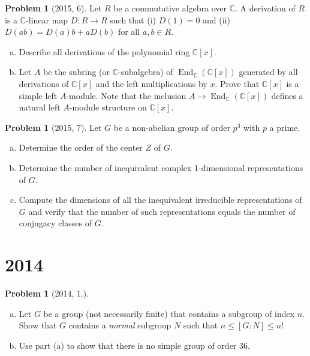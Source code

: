 \documentclass{article}
\newcommand{\<}{\langle} %
\renewcommand{\>}{\rangle} %
\DeclareMathOperator{\End}{End}
\theoremstyle{plain}
\theoremstyle{remark}
\theoremstyle{definition}
\newtheorem{examproblem}[equation]{Problem}
\begin{document}
\begin{examproblem}[2015, 6]
	Let $R$ be a commutative algebra over $\mathbb C$. A derivation of $R$ is a
	$\mathbb C$-linear map $D:R\rightarrow R$ such that (i) $D(1)=0$ and
	(ii) $D(ab)=D(a)b+aD(b)$ for all $a,b\in R$.
	\begin{enumerate}[(a)]
		\item Describe all derivations of the polynomial ring $\mathbb C[x]$.
		\item Let $A$ be the subring (or $\mathbb C$-subalgebra) of
			$\End_{\mathbb C}(\mathbb C[x])$ generated by all derivations
			of $\mathbb C[x]$ and the left multiplications by $x$.
			Prove that $\mathbb C[x]$ is a simple left $A$-module.
			Note that the inclusion $A\rightarrow\End_{\mathbb C}(\mathbb C[x])$
			defines a natural left $A$-module structure on $\mathbb C[x]$.
	\end{enumerate}
\end{examproblem}


\begin{examproblem}[2015, 7]
	Let $G$ be a non-abelian group of order $p^3$ with $p$ a prime.
	\begin{enumerate}[(a)]
		\item Determine the order of the center $Z$ of $G$.
		\item Determine the number of inequivalent complex
			1-dimensional representations of $G$.
		\item Compute the dimensions of all the inequivalent irreducible
			representations of $G$ and verify that the number of such
			representations equals the number of conjugacy classes of
			$G$.
	\end{enumerate}
\end{examproblem}

\newpage

\section{2014}

\begin{examproblem}[2014, 1.]
	\begin{enumerate}[(a)]
		\item Let $G$ be a group (not necessarily finite) that contains
			a subgroup of index $n$. Show that $G$ contains a
			\textit{normal} subgroup $N$ such that $n\leq[G:N]\leq n!$
		\item Use part (a) to show that there is no simple group
			of order 36.
	\end{enumerate}
\end{examproblem}
\end{document}
